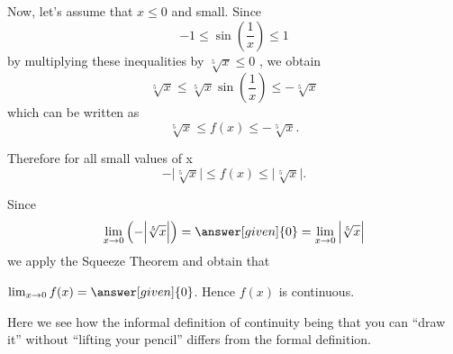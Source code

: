 \documentclass{ximera}
\begin{document}
\begin{example}
\begin{explanation}
Now, let's assume that $x\le0$ and small.
Since
\[
-1\le \sin{\left(\frac{1}{x}\right)}\le 1 %
\]
by multiplying these inequalities by $\sqrt[5]{x} \le0$
, we obtain
\[
\sqrt[5]{x} \le \sqrt[5]{x}\sin{\left(\frac{1}{x}\right)} \le -\sqrt[5]{x}
\]                              %
which can be written as
\[
  \sqrt[5]{x} \le f(x) \le -\sqrt[5]{x}.
\]

Therefore for all small values of x
\[
-\Big|\sqrt[5]{x}\Big| \le f(x) \le \Big|\sqrt[5]{x}\Big|.
\]

Since
\[
  \lim_{x\to 0} \left( - \Big|\sqrt[5]{x}\Big|  \right)
  = \answer[given]{0} = \lim_{x\to 0}\Big|\sqrt[5]{x}\Big|
\]
 we apply the Squeeze Theorem and obtain that

$\lim_{x\to 0} f(x) = \answer[given]{0}$. Hence $f(x)$ is continuous.

Here we see how the informal definition of continuity being that you
can ``draw it'' without ``lifting your pencil'' differs from the
formal definition.
\end{explanation}
\end{example}
\end{document}
